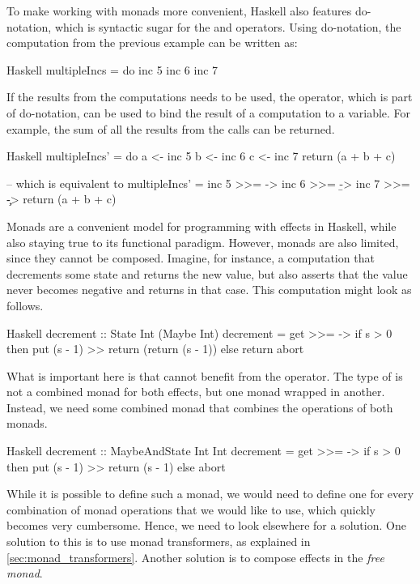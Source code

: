To make working with monads more convenient, Haskell also features do-notation, which is syntactic sugar for the \hs{>>=} and \hs{>>} operators. Using do-notation, the  computation from the previous example can be written as:

\begin{lst}{Haskell}
multipleIncs = do
  inc 5
  inc 6
  inc 7
\end{lst}
%
If the results from the  computations needs to be used, the \hs{<-} operator, which is part of do-notation, can be used to bind the result of a computation to a variable. For example, the sum of all the results from the  calls can be returned.

\begin{lst}{Haskell}
multipleIncs' = do
  a <- inc 5
  b <- inc 6
  c <- inc 7
  return (a + b + c)

-- which is equivalent to
multipleIncs' = 
  inc 5 >>= \a ->
    inc 6 >>= \b ->
      inc 7 >>= \c ->
        return (a + b + c)
\end{lst}
%
Monads are a convenient model for programming with effects in Haskell, while also staying true to its functional paradigm. However, monads are also limited, since they cannot be composed. Imagine, for instance, a computation that decrements some state and returns the new value, but also asserts that the value never becomes negative and returns  in that case. This computation might look as follows.

\begin{lst}{Haskell}
decrement :: State Int (Maybe Int)
decrement = get >>= \s ->
              if s > 0
              then put (s - 1) >> return (return (s - 1))
              else return abort
\end{lst}
%
What is important here is that  cannot benefit from the \hs{>>=} operator. The type of  is not a combined monad for both effects, but one monad wrapped in another. Instead, we need some combined monad  that combines the operations of both monads.

\begin{lst}{Haskell}
decrement :: MaybeAndState Int Int
decrement = get >>= \s ->
              if s > 0
              then put (s - 1) >> return (s - 1)
              else abort
\end{lst}
%
While it is possible to define such a monad, we would need to define one for every combination of monad operations that we would like to use, which quickly becomes very cumbersome. Hence, we need to look elsewhere for a solution. One solution to this is to use monad transformers, as explained in \cref{sec:monad_transformers}. Another solution is to compose effects in the \emph{free monad}.

